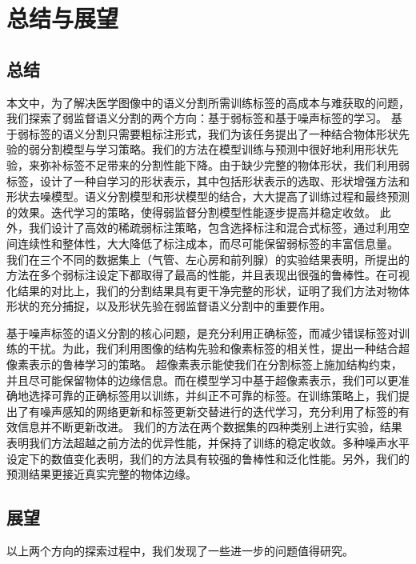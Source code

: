 \chapter{总结与展望}

\section{总结}
本文中，为了解决医学图像中的语义分割所需训练标签的高成本与难获取的问题，我们探索了弱监督语义分割的两个方向：基于弱标签和基于噪声标签的学习。
基于弱标签的语义分割只需要粗标注形式，我们为该任务提出了一种结合物体形状先验的弱分割模型与学习策略。我们的方法在模型训练与预测中很好地利用形状先验，来弥补标签不足带来的分割性能下降。由于缺少完整的物体形状，我们利用弱标签，设计了一种自学习的形状表示，其中包括形状表示的选取、形状增强方法和形状去噪模型。语义分割模型和形状模型的结合，大大提高了训练过程和最终预测的效果。迭代学习的策略，使得弱监督分割模型性能逐步提高并稳定收敛。
此外，我们设计了高效的稀疏弱标注策略，包含选择标注和混合式标签，通过利用空间连续性和整体性，大大降低了标注成本，而尽可能保留弱标签的丰富信息量。
我们在三个不同的数据集上（气管、左心房和前列腺）的实验结果表明，所提出的方法在多个弱标注设定下都取得了最高的性能，并且表现出很强的鲁棒性。在可视化结果的对比上，我们的分割结果具有更干净完整的形状，证明了我们方法对物体形状的充分捕捉，以及形状先验在弱监督语义分割中的重要作用。

基于噪声标签的语义分割的核心问题，是充分利用正确标签，而减少错误标签对训练的干扰。为此，我们利用图像的结构先验和像素标签的相关性，提出一种结合超像素表示的鲁棒学习的策略。
超像素表示能使我们在分割标签上施加结构约束，并且尽可能保留物体的边缘信息。而在模型学习中基于超像素表示，我们可以更准确地选择可靠的正确标签用以训练，并纠正不可靠的标签。在训练策略上，我们提出了有噪声感知的网络更新和标签更新交替进行的迭代学习，充分利用了标签的有效信息并不断更新改进。
我们的方法在两个数据集的四种类别上进行实验，结果表明我们方法超越之前方法的优异性能，并保持了训练的稳定收敛。多种噪声水平设定下的数值变化表明，我们的方法具有较强的鲁棒性和泛化性能。另外，我们的预测结果更接近真实完整的物体边缘。

\section{展望}
以上两个方向的探索过程中，我们发现了一些进一步的问题值得研究。

